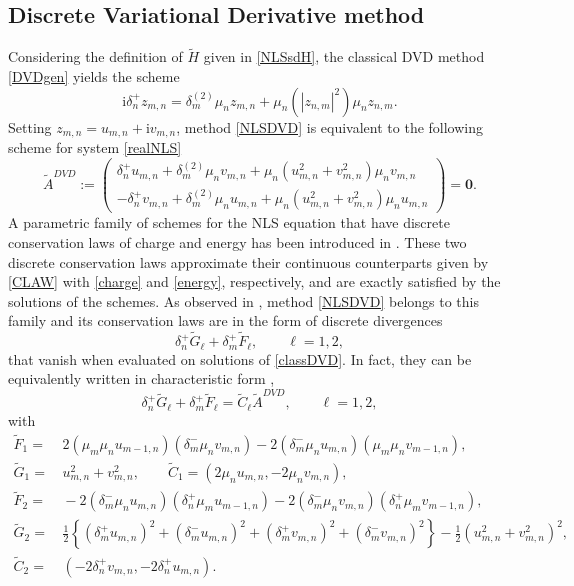 \documentclass[twoside]{article}
\numberwithin{equation}{section}
\begin{document}
\subsection{Discrete Variational Derivative method}
Considering the definition of $\widetilde{H}$ given in \eqref{NLSsdH}, the classical DVD method \eqref{DVDgen} yields the scheme \cite{Matsuo}
\begin{equation}\label{NLSDVD}
\mathrm{i}\delta_n^+z_{m,n}=\delta_m^{(2)}\mu_nz_{m,n}+\mu_n(|z_{n,m}|^2)\mu_nz_{n,m}.
\end{equation}
Setting $z_{m,n}=u_{m,n}+\mathrm{i}v_{m,n}$, method  \eqref{NLSDVD} is equivalent to the following scheme for system \eqref{realNLS}
\begin{equation}\label{classDVD}
\widetilde{A}^{DVD}:=\left(\begin{array}{c}
\delta_n^+u_{m,n}+\delta_m^{(2)}\mu_nv_{m,n}+\mu_n(u_{m,n}^2+v_{m,n}^2)\mu_nv_{m,n}\\
-\delta_n^+v_{m,n}+\delta_m^{(2)}\mu_nu_{m,n}+\mu_n(u_{m,n}^2+v_{m,n}^2)\mu_nu_{m,n}
\end{array}\right)=\mathbf{0}.
\end{equation}
A parametric family of schemes for the NLS equation that have discrete conservation laws of charge and energy has been introduced in \cite{AMC}.  These two discrete conservation laws approximate their continuous counterparts given by \eqref{CLAW} with \eqref{charge} and \eqref{energy}, respectively, and are exactly satisfied by the solutions of the schemes.  As observed in \cite{AMC}, method \eqref{NLSDVD} belongs to this family and its conservation laws are in the form of discrete divergences
\begin{equation}\label{discdiv}
\delta_n^+ \widetilde{G}_\ell + \delta_m^+ \widetilde{F}_\ell, \qquad \ell=1,2,
\end{equation}
that vanish when evaluated on solutions of \eqref{classDVD}. In fact, they can be equivalently written in characteristic form \cite{AMC},
\begin{equation}\label{discCL}
\delta_n^+ \widetilde{G}_\ell + \delta_m^+ \widetilde{F}_\ell=\widetilde{C}_\ell \widetilde{A}^{DVD}, \qquad \ell=1,2,
\end{equation}
with 
\begin{align}\nonumber
\widetilde{F}_1=&\,2(\mu_m\mu_nu_{m-1,n})(\delta_m^-\mu_nv_{m,n})-2(\delta_m^-\mu_nu_{m,n})(\mu_m\mu_nv_{m-1,n}),\\\nonumber
\widetilde{G}_1=&\,u_{m,n}^2+v_{m,n}^2,\qquad \widetilde{C}_1=(2\mu_nu_{m,n},-2\mu_nv_{m,n}),\\\label{FGQ}
\widetilde{F}_2=&\,-2(\delta_m^-\mu_nu_{m,n})(\delta_n^+\mu_mu_{m-1,n})-2(\delta_m^-\mu_nv_{m,n})(\delta_n^+\mu_mv_{m-1,n}),\\\nonumber
\widetilde{G}_2=&\,\tfrac{1}2\left\{(\delta_m^+u_{m,n})^2+(\delta_m^-u_{m,n})^2+(\delta_m^+v_{m,n})^2+(\delta_m^-v_{m,n})^2\right\}-\tfrac{1}2(u_{m,n}^2+v_{m,n}^2)^2,\\\nonumber
\widetilde{C}_2=&\,(-2\delta_n^+v_{m,n},-2\delta_n^+u_{m,n}).
\end{align}
\end{document}

